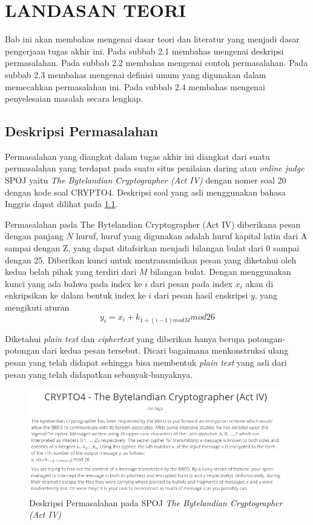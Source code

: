 	\chapter{LANDASAN TEORI}
	Bab ini akan membahas mengenai dasar teori dan literatur yang menjadi dasar pengerjaan tugas akhir ini. Pada subbab 2.1 membahas mengenai deskripsi permasalahan. Pada subbab 2.2 membahas mengenai contoh permasalahan. Pada subbab 2.3 membahas mengenai definisi umum yang digunakan dalam memecahkan permasalahan ini. Pada subbab 2.4 membahas mengenai penyelesaian masalah secara lengkap.
	\section{Deskripsi Permasalahan}
	\label{chapter:dasar-teori}
	Permasalahan yang diangkat dalam tugas akhir ini diangkat dari suatu permasalahan yang terdapat pada suatu situs penilaian daring atau \textit{online judge} SPOJ yaitu \textit{The Bytelandian Cryptographer (Act IV)} dengan nomer soal 20 dengan kode soal CRYPTO4. Deskripsi soal yang asli menggunakan bahasa Inggris dapat dilihat pada \ref{fig:crypto4_def}.\cite{piwakowski_crypto4_2004}
	
	
	 Permasalahan pada The Bytelandian Cryptographer (Act IV) diberikana pesan dengan panjang $N$ huruf, huruf yang digunakan adalah huruf kapital latin dari A sampai dengan Z, yang dapat ditafsirkan menjadi bilangan bulat dari 0 sampai dengan 25. Diberikan kunci untuk mentransmisikan pesan yang diketahui oleh kedua belah pihak yang terdiri dari $M$ bilangan bulat. Dengan menggunakan kunci yang ada bahwa pada index ke $i$ dari pesan pada index $x_i$ akan di enkripsikan ke dalam bentuk index ke $i$ dari pesan hasil enskripsi $y$, yang mengikuti aturan
	 $$y_i=x_i+k_{1+(i-1)mod M} mod 26 $$
	 
	 
	 Diketahui \textit{plain text} dan \textit{ciphertext} yang diberikan hanya berupa potongan-potongan dari kedua pesan tersebut. Dicari bagaimana menkonstruksi ulang pesan yang telah didapat sehingga bisa membentuk \textit{plain text} yang asli dari pesan yang telah didapatkan sebanyak-banyaknya.
	\begin{figure}[H]
		\centering
		\includegraphics[scale=0.5]{images/bab2/crypto_def.png}
		\caption{Deskripsi Permasalahan pada SPOJ \textit{The Bytelandian Cryptographer (Act IV)}}
		\label{fig:crypto4_def}
	\end{figure}
	
